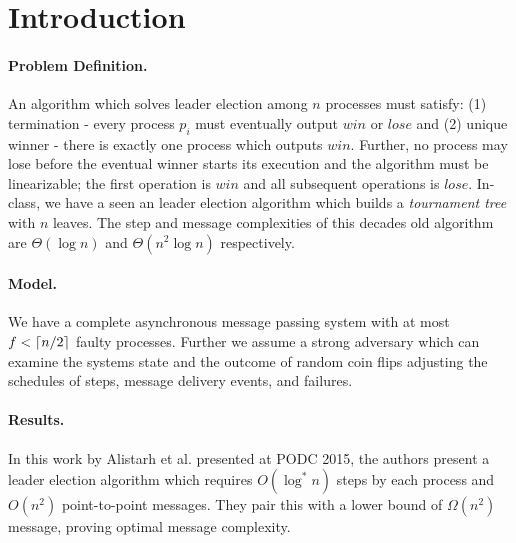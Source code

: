 \documentclass[
10pt, %
a4paper, %
onecolumn, %
]{article}
\begin{document}
\pagestyle{myheadings} %
\markright{\doctitle} %


\thispagestyle{plain} %

\printtitle %


\section{Introduction}
\paragraph{Problem Definition.} An algorithm which solves leader election among $n$ processes must satisfy: (1) termination - every process $p_i$ must eventually output $win$ or $lose$ and (2) unique winner - there is exactly one process which outputs $win$. Further, no process may lose before the eventual winner starts its execution and the algorithm must be linearizable; the first operation is $win$ and all subsequent operations is $lose$. In-class, we have a seen an leader election algorithm which builds a \emph{tournament tree} with $n$ leaves. The step and message complexities of this decades old algorithm are $\Theta(\log n)$ and $\Theta(n^2\log n)$ respectively. 

\paragraph{Model.} We have a complete asynchronous message passing system with at most $f < \lceil n/2\rceil$ faulty processes. Further we assume a strong adversary which can  examine the systems state and the outcome of random coin flips adjusting the schedules of steps, message delivery events, and failures.  

\paragraph{Results.} In this work by Alistarh et al. presented at PODC 2015, the authors present a leader election algorithm which requires $O(\log^*n)$ steps by each process and $O(n^2)$ point-to-point messages. They pair this with a lower bound of $\Omega(n^2)$ message, proving optimal message complexity.
\end{document}
